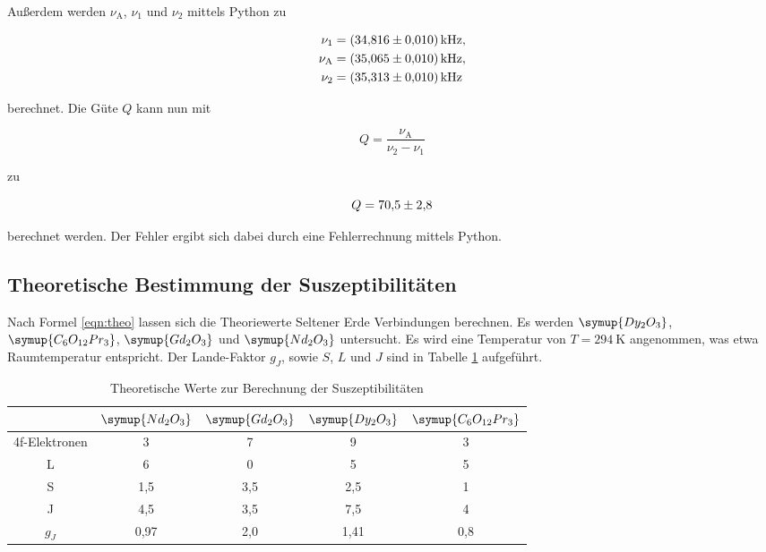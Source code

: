 Außerdem werden $\nu_\text{A}$, $\nu_1$ und $\nu_2$ mittels Python zu

\begin{align*}
\nu_1 &= \SI{34.816+-0.01}{\kilo\hertz},\\
\nu_\text{A} &= \SI{35.065+-0.01}{\kilo\hertz},\\
\nu_2 &= \SI{35.313+-0.01}{\kilo\hertz}
\end{align*}

berechnet. Die Güte $Q$ kann nun mit 

\begin{equation*}
Q = \frac{\nu_\text{A}}{\nu_2 - \nu_1}
\end{equation*}

zu 

\begin{equation*}
Q = \num{70.5+-2.8}
\end{equation*}

berechnet werden.
Der Fehler ergibt sich dabei durch eine Fehlerrechnung mittels 
Python.

\subsection{Theoretische Bestimmung der Suszeptibilitäten}

Nach Formel \eqref{eqn:theo} lassen sich die Theoriewerte Seltener 
Erde Verbindungen berechnen. Es werden $\symup{Dy_2O_3}$, $\symup{C_6O_{12}Pr_3}$, 
$\symup{Gd_2O_3}$ und $\symup{Nd_2O_3}$ untersucht. Es wird eine Temperatur von 
$T = \SI{294}{\kelvin}$ angenommen, was etwa Raumtemperatur entspricht.
Der Lande-Faktor $g_J$, sowie $S$, $L$ und $J$ sind in Tabelle \ref{tab:theo} 
aufgeführt.

\begin{table}
\centering
\caption{Theoretische Werte zur Berechnung der Suszeptibilitäten}
\label{tab:theo}
\begin{tabular}{c c c c c}
\toprule
& $\symup{Nd_2O_3}$ & $\symup{Gd_2O_3}$ & $\symup{Dy_2O_3}$ & $\symup{C_6O_{12}Pr_3}$\\
\midrule
4f-Elektronen & 3    & 7   & 9    & 3\\
L             & 6    & 0   & 5    & 5\\
S             & 1,5  & 3,5 & 2,5  & 1\\
J             & 4,5  & 3,5 & 7,5  & 4\\
$g_J$         & 0,97 & 2,0 & 1,41 & 0,8\\
\bottomrule
\end{tabular}
\end{table}

